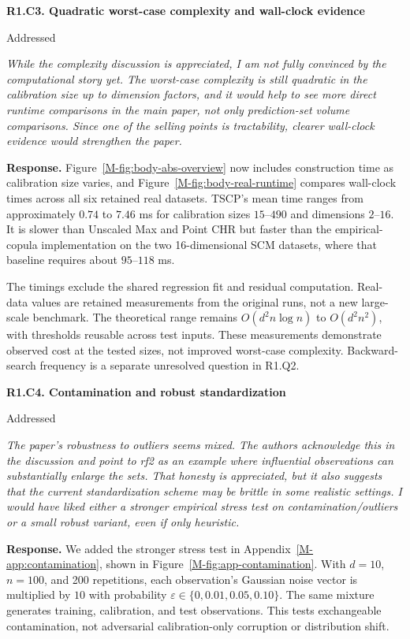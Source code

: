 \documentclass[11pt]{article}
\newcommand{\msapp}[1]{Appendix~\ref*{M-#1}}
\newcommand{\msfig}[1]{Figure~\ref*{M-#1}}
\newcommand{\point}[3]{\par\Needspace{7\baselineskip}\medskip
\noindent\parbox[t]{0.77\linewidth}{\textbf{#1}}\hfill
\parbox[t]{0.21\linewidth}{\raggedleft\small\sffamily #2}\par\nopagebreak
{\color{ReviewerBlue}\small\itshape #3\par}\textbf{Response.} }
\begin{document}
\point{R1.C3. Quadratic worst-case complexity and wall-clock evidence}{Addressed}{While the complexity discussion is appreciated, I am not fully convinced
by the computational story yet. The worst-case complexity is still
quadratic in the calibration size up to dimension factors, and it would
help to see more direct runtime comparisons in the main paper, not only
prediction-set volume comparisons. Since one of the selling points is
tractability, clearer wall-clock evidence would strengthen the paper.}
\label{response:R1.C3}
\msfig{fig:body-abs-overview} now includes construction time as calibration size varies, and \msfig{fig:body-real-runtime} compares wall-clock times across all six retained real datasets. TSCP's mean time ranges from approximately $0.74$ to $7.46$ ms for calibration sizes $15$--$490$ and dimensions $2$--$16$. It is slower than Unscaled Max and Point CHR but faster than the empirical-copula implementation on the two 16-dimensional SCM datasets, where that baseline requires about $95$--$118$ ms.

The timings exclude the shared regression fit and residual computation. Real-data values are retained measurements from the original runs, not a new large-scale benchmark. The theoretical range remains $O(d^2n\log n)$ to $O(d^2n^2)$, with thresholds reusable across test inputs. These measurements demonstrate observed cost at the tested sizes, not improved worst-case complexity. Backward-search frequency is a separate unresolved question in R1.Q2.

\point{R1.C4. Contamination and robust standardization}{Addressed}{The paper's robustness to outliers seems mixed. The authors acknowledge
this in the discussion and point to rf2 as an example where influential
observations can substantially enlarge the sets. That honesty is
appreciated, but it also suggests that the current standardization
scheme may be brittle in some realistic settings. I would have liked
either a stronger empirical stress test on contamination/outliers or a
small robust variant, even if only heuristic.}
\label{response:R1.C4}
We added the stronger stress test in \msapp{app:contamination}, shown in \msfig{fig:app-contamination}. With $d=10$, $n=100$, and 200 repetitions, each observation's Gaussian noise vector is multiplied by $10$ with probability $\varepsilon\in\{0,0.01,0.05,0.10\}$. The same mixture generates training, calibration, and test observations. This tests exchangeable contamination, not adversarial calibration-only corruption or distribution shift.
\end{document}
